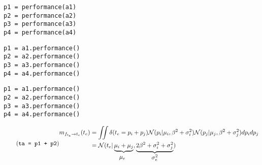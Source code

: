 \documentclass[article]{jss}
\newif\ifen
\newif\ifes
\newcommand{\en}[1]{\ifen#1\fi}
\newcommand{\es}[1]{\ifes#1\fi}
\newcommand{\N}{\mathcal{N}}
\begin{document}
\es{Tenemos acceso a estos mensajes mediante el método \texttt{performance()} de la clase \texttt{Player}.}
%
\begin{lstlisting}[backgroundcolor=\color{white},label=lst:performance, caption={\en{Computing the individual prior performance}\es{Computando el desempeño individual a priori}}, belowskip=-1.0 \baselineskip, aboveskip=0.0 \baselineskip]
\end{lstlisting}
\begin{paracol}{3}
\begin{lstlisting}[backgroundcolor=\color{julia}]
p1 = performance(a1)
p2 = performance(a2)
p3 = performance(a3)
p4 = performance(a4)
\end{lstlisting}
  \switchcolumn
\begin{lstlisting}[backgroundcolor=\color{python}]
p1 = a1.performance()
p2 = a2.performance()
p3 = a3.performance()
p4 = a4.performance()
\end{lstlisting}
   \switchcolumn
\begin{lstlisting}[backgroundcolor=\color{r}]
p1 = a1.performance()
p2 = a2.performance()
p3 = a3.performance()
p4 = a4.performance()
\end{lstlisting}  
\end{paracol}
%
\en{Where the agents \texttt{a1}, \texttt{a2}, \texttt{a3}, and \texttt{a4} were initialized at code~\ref{lst:player}.}
\es{Donde los agentes \texttt{a1}, \texttt{a2}, \texttt{a3} y \texttt{a4}, fueron inicializados en el código~\ref{lst:player}.}
%
\en{The message sent by the team factors $f_{t_e}$ to the team variable $t_e$ is an integral over all the individual performance variables, with the sum being equal to a constant $t_e$ (constraint imposed by the Dirac delta function).}
\es{El mensaje que envían los factores equipos $f_{t_e}$ a la variable equipo $t_e$ es una integral sobre todas las variables de rendimiento individuales, siendo la suma igual a una constante $t_e$ (restricción impuesta por la función delta de Dirac).}
%
\begin{equation} \label{eq:m_ft_t} \tag{\texttt{ta = p1 + p2}}
\begin{split}
 m_{f_{t_e} \rightarrow t_e}(t_e) &= \iint \delta(t_e = p_i + p_j) \N(p_i|\mu_i,\beta^2 + \sigma_i^2)\N(p_j|\mu_j,\beta^2 + \sigma_j^2) dp_idp_j  \\ &=  \N(t_e|\underbrace{\mu_i+\mu_j}_{\text{\normalsize $\mu_e\phantom{^2}$}}, \underbrace{2\beta^2 + \sigma_i^2 + \sigma_j^2}_{\text{\normalsize $\sigma_e^2$}})
\end{split}
\end{equation}
\end{document}

